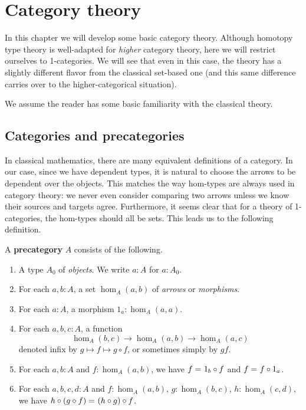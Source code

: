 \newcommand{\uset}{\ensuremath{\underline{\set}}\xspace}
\newcommand{\inv}[1]{{#1}^{-1}}
\newcommand{\idtoiso}{\ensuremath{\mathsf{idtoiso}}\xspace}
\newcommand{\isotoid}{\ensuremath{\mathsf{isotoid}}\xspace}
\newcommand{\op}{^{\textrm{op}}}
\newcommand{\y}{\ensuremath{\mathbf{y}}\xspace}

\chapter{Category theory}
\label{cha:category-theory}

In this chapter we will develop some basic category theory.
Although homotopy type theory is well-adapted for \emph{higher} category theory, here we will restrict ourselves to 1-categories.
We will see that even in this case, the theory has a slightly different flavor from the classical set-based one (and this same difference carries over to the higher-categorical situation).

We assume the reader has some basic familiarity with the classical theory.


\section{Categories and precategories}
\label{sec:cats}

In classical mathematics, there are many equivalent definitions of a category.
In our case, since we have dependent types, it is natural to choose the arrows to be dependent over the objects.
This matches the way hom-types are always used in category theory: we never even consider comparing two arrows unless we know their sources and targets agree.
Furthermore, it seems clear that for a theory of 1-categories, the hom-types should all be sets.
This leads us to the following definition.

\begin{defn}\label{ct:precategory}
  A \textbf{precategory} $A$ consists of the following.
  \begin{enumerate}
  \item A type $A_0$ of \emph{objects}.  We write $a:A$ for $a:A_0$.
  \item For each $a,b:A$, a set $\hom_A(a,b)$ of \emph{arrows} or \emph{morphisms}.
  \item For each $a:A$, a morphism $1_a:\hom_A(a,a)$.
  \item For each $a,b,c:A$, a function
    \[  \hom_A(b,c) \to \hom_A(a,b) \to \hom_A(a,c) \]
    denoted infix by $g\mapsto f\mapsto g\circ f$, or sometimes simply by $gf$.
  \item For each $a,b:A$ and $f:\hom_A(a,b)$, we have $f =_{} 1_b\circ f$ and $f =_{} f\circ 1_a$.
  \item For each $a,b,c,d:A$ and $f:\hom_A(a,b)$, $g:\hom_A(b,c)$, $h:\hom_A(c,d)$, we have $h\circ (g\circ f) =_{} (h\circ g)\circ f$.
  \end{enumerate}
\end{defn}

